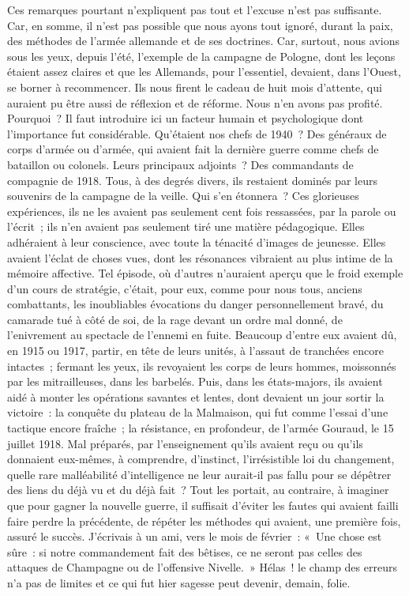 \documentclass[french,twoside]{book} %
\begin{document}
Ces remarques pourtant n’expliquent pas tout et l’excuse n’est pas suffisante. Car, en somme, il n’est pas possible que nous ayons tout ignoré, durant la paix, des méthodes de l’armée allemande et de ses doctrines. Car, surtout, nous avions sous les yeux, depuis l’été, l’exemple de la campagne de Pologne, dont les leçons étaient assez claires et que les Allemands, pour l’essentiel, devaient, dans l’Ouest, se borner à recommencer. Ils nous firent le cadeau de huit mois d’attente, qui auraient pu être aussi de réflexion et de réforme. Nous n’en avons pas profité. Pourquoi ? Il faut introduire ici un facteur humain et psychologique dont l’importance fut considérable. Qu’étaient nos chefs de 1940 ? Des généraux de corps d’armée ou d’armée, qui avaient fait la dernière guerre comme chefs de bataillon ou colonels. Leurs principaux adjoints ? Des commandants de compagnie de 1918. Tous, à des degrés divers, ils restaient dominés par leurs souvenirs de la campagne de la veille. Qui s’en étonnera ? Ces glorieuses expériences, ils ne les avaient pas seulement cent fois ressassées, par la parole ou l’écrit ; ils n’en avaient pas seulement tiré une matière pédagogique. Elles adhéraient à leur conscience, avec toute la ténacité d’images de jeunesse. Elles avaient l’éclat de choses vues, dont les résonances vibraient au plus intime de la mémoire affective. Tel épisode, où d’autres n’auraient aperçu que le froid exemple d’un cours de stratégie, c’était, pour eux, comme pour nous tous, anciens combattants, les inoubliables évocations du danger personnellement bravé, du   camarade tué à côté de soi, de la rage devant un ordre mal donné, de l’enivrement au spectacle de l’ennemi en fuite. Beaucoup d’entre eux avaient dû, en 1915 ou 1917, partir, en tête de leurs unités, à l’assaut de tranchées encore intactes ; fermant les yeux, ils revoyaient les corps de leurs hommes, moissonnés par les mitrailleuses, dans les barbelés. Puis, dans les états-majors, ils avaient aidé à monter les opérations savantes et lentes, dont devaient un jour sortir la victoire : la conquête du plateau de la Malmaison, qui fut comme l’essai d’une tactique encore fraîche ; la résistance, en profondeur, de l’armée Gouraud, le 15 juillet 1918. Mal préparés, par l’enseignement qu’ils avaient reçu ou qu’ils donnaient eux-mêmes, à comprendre, d’instinct, l’irrésistible loi du changement, quelle rare malléabilité d’intelligence ne leur aurait-il pas fallu pour se dépêtrer des liens du déjà vu et du déjà fait ? Tout les portait, au contraire, à imaginer que pour gagner la nouvelle guerre, il suffisait d’éviter les fautes qui avaient failli faire perdre la précédente, de répéter les méthodes qui avaient, une première fois, assuré le succès. J’écrivais à un ami, vers le mois de février : « Une chose est sûre : si notre commandement fait des bêtises, ce ne seront pas celles des attaques de Champagne ou de l’offensive Nivelle. » Hélas ! le champ des erreurs n’a pas de limites et ce qui fut hier sagesse peut devenir, demain, folie.\par
\end{document}

